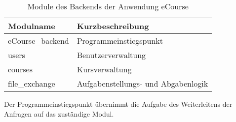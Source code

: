\begin{table}[H]
\centering
\begin{tabularx}{\textwidth}[H]{|X|X|}
\hline
Modulname & Kurzbeschreibung\\
\hline
eCourse\_backend & Programmeinstiegspunkt\\
\hline
users & Benutzerverwaltung \\
\hline
courses & Kursverwaltung \\
\hline
file\_exchange & Aufgabenstellungs- und Abgabenlogik \\
\hline
\end{tabularx}
\caption{Module des Backends der Anwendung eCourse}
\label{tab:module}
\end{table}

Der Programmeinstiegspunkt übernimmt die Aufgabe des Weiterleitens der Anfragen auf das zuständige Modul.
